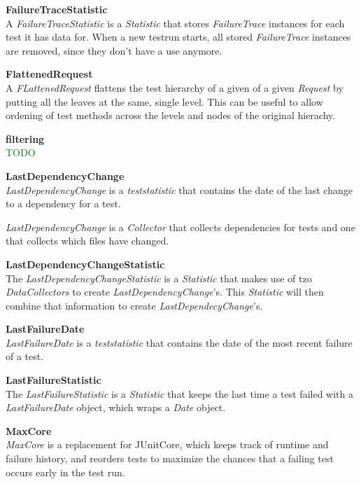 \documentclass[i2]{oss}
\newcommand{\class}[1]{\emph{#1}}
\newcommand{\gloss}[1]{\textbf{#1}}
\newcommand{\comment}[1]{{\huge \textcolor{green}{#1}}\\}
\begin{document}
\begin{description}
\item \gloss{FailureTraceStatistic}\\
A \class{FailureTraceStatistic} is a \class{Statistic} that stores \class{FailureTrace} instances for each test it has data for. When a new testrun starts, all stored \class{FailureTrace} instances are removed, since they don't have a use anymore.
	

\item \gloss{FlattenedRequest}\\
A \class{FLattenedRequest} flattens the test hierarchy of a given of a given \class{Request} by putting all the leaves at the same, single level. This can be useful to allow ordening of test methods across the levels and nodes of the original hierachy.

\item \gloss{filtering}\\
\comment{TODO}

\item \gloss{LastDependencyChange} \\
\class{LastDependencyChange} is a \class{teststatistic} that contains the date of the last change to a dependency for a test.

\class{LastDependencyChange} is a \class{Collector} that collects dependencies for tests and one that collects which files have changed.

\item \gloss{LastDependencyChangeStatistic} \\

The \class{LastDependencyChangeStatistic} is a \class{Statistic} that makes use of tzo \class{DataCollectors} to create \class{LastDependencyChange}'s. This \class{Statistic} will then combine that information to create \class{LastDependecyChange}'s.

\item \gloss{LastFailureDate} \\
\class{LastFailureDate} is a \class{teststatistic} that contains the date of the most recent failure of a test.

\item \gloss{LastFailureStatistic}\\
 The \class{LastFailureStatistic} is a \class{Statistic} that keeps the last time a test failed with a \class{LastFailureDate} object, which wraps a \class{Date} object.

\item \gloss{MaxCore} \\
\class{MaxCore} is a replacement for JUnitCore, which keeps track of runtime and failure history, and reorders tests to maximize the chances that a failing test occurs early in the test run.


\end{description}
\end{document}
